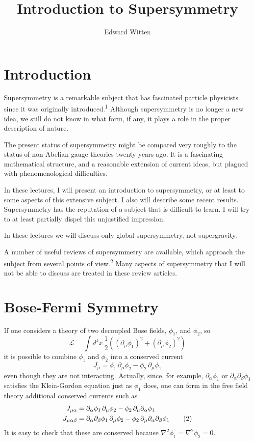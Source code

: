 \documentclass[11pt,a4paper]{article}
\title{Introduction to Supersymmetry}
\author{Edward Witten\note{Supported in part by NSF Grant PHY80-19754.}}
\affiliation{Joseph Henry Laboratories,\\
Princeton University,\\
Princeton, New Jersey 08544}
\begin{document}
\maketitle
\flushbottom

\section{Introduction}

Supersymmetry is a remarkable subject that has fascinated
particle physicists since it was originally introduced.\textsuperscript{1}
Although supersymmetry is no longer a new idea, we still do not know in what
form, if any, it plays a role in the proper description of nature.

The present status of supersymmetry might be compared very
roughly to the status of non-Abelian gauge theories twenty years ago.
It is a fascinating mathematical structure, and a reasonable extension
of current ideas, but plagued with phenomenological difficulties.

In these lectures, I will present an introduction to supersymmetry,
or at least to some aspects of this extensive subject. I
also will describe some recent results. Supersymmetry has the reputation
of a subject that is difficult to learn. I will try to at
least partially dispel this unjustified impression.

In these lectures we will discuss only global supersymmetry,
not supergravity.

A number of useful reviews of supersymmetry are available,
which approach the subject from several points of view.\textsuperscript{2}
Many aspects of supersymmetry that I will not be able to discuss are
treated in these review articles.

\section{Bose-Fermi Symmetry}

If one considers a theory of two decoupled Bose fields, $\phi_1$, and
$\phi_2$, so
\begin{equation}
\mathcal{L} = \int d^4x \, \frac{1}{2}\left((\partial_\mu \phi_1)^2 + (\partial_\mu \phi_2)^2\right)
\tag{1}
\end{equation}
it is possible to combine $\phi_1$ and $\phi_2$ into a conserved current
\[
J_\mu = \phi_1\, \partial_\mu \phi_2 - \phi_2\, \partial_\mu \phi_1
\]
even though they are not interacting.
Actually, since, for example, $\partial_\alpha \phi_1$ or
$\partial_\alpha \partial_\beta \phi_1$ satisfies the Klein-Gordon
equation just as $\phi_1$ does, one can form in the free field
theory additional conserved currents such as
\begin{align}
J_{\mu\alpha} &= \partial_\alpha \phi_1\, \partial_\mu \phi_2 - \phi_2\, \partial_\mu \partial_\alpha \phi_1 \notag\\
J_{\mu\alpha\beta} &= \partial_\alpha \partial_\beta \phi_1\, \partial_\mu \phi_2 - \phi_2\, \partial_\mu \partial_\alpha \partial_\beta \phi_1
\tag{2}
\end{align}
It is easy to check that these are conserved because
$\nabla^2 \phi_1 = \nabla^2 \phi_2 = 0$.
\end{document}
